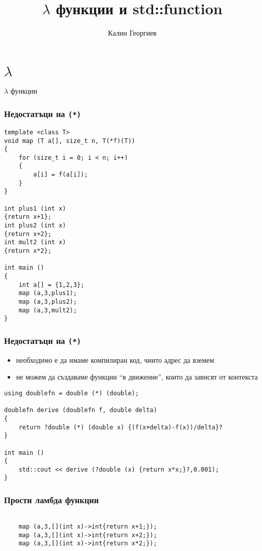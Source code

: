 \documentclass{beamer}
\begin{document}
\title[Обектно ориентирано програмиране]{$\lambda$ функции и std::function}
\author{Калин Георгиев}
\frame{\titlepage}

\section{$\lambda$}


\begin{frame}
    \centerline{$\lambda$ функции}
\end{frame}

\begin{frame}[fragile]
    \frametitle{Недостатъци на \texttt{(*)}}
    
\begin{lstlisting}[basicstyle=\tiny]
template <class T>
void map (T a[], size_t n, T(*f)(T))
{ 
    for (size_t i = 0; i < n; i++)
    {
        a[i] = f(a[i]);
    }
}

int plus1 (int x)
{return x+1};
int plus2 (int x)
{return x+2};
int mult2 (int x)
{return x*2};

int main ()
{
    int a[] = {1,2,3};
    map (a,3,plus1);
    map (a,3,plus2);
    map (a,3,mult2);
}
\end{lstlisting}
\end{frame}



\begin{frame}[fragile]
    \frametitle{Недостатъци на \texttt{(*)}}
    
    \begin{itemize}
        \item необходимо е да имаме компилиран код, чиито адрес да вземем
        \item не можем да създаваме функции ``в движение'', които да зависят от контекста
    \end{itemize}
    
\begin{lstlisting}[basicstyle=\tiny]
using doublefn = double (*) (double);

doublefn derive (doublefn f, double delta)
{ 
    return ?double (*) (double x) {(f(x+delta)-f(x))/delta}?
}

int main ()
{
    std::cout << derive (?double (x) {return x*x;}?,0.001);
}
\end{lstlisting}
\end{frame}
    


\begin{frame}[fragile]
    \frametitle{Прости ламбда функции}
    
\begin{lstlisting}[]

    map (a,3,[](int x)->int{return x+1;});
    map (a,3,[](int x)->int{return x+2;});
    map (a,3,[](int x)->int{return x*2;});

\end{lstlisting}
\end{frame}
\end{document}

